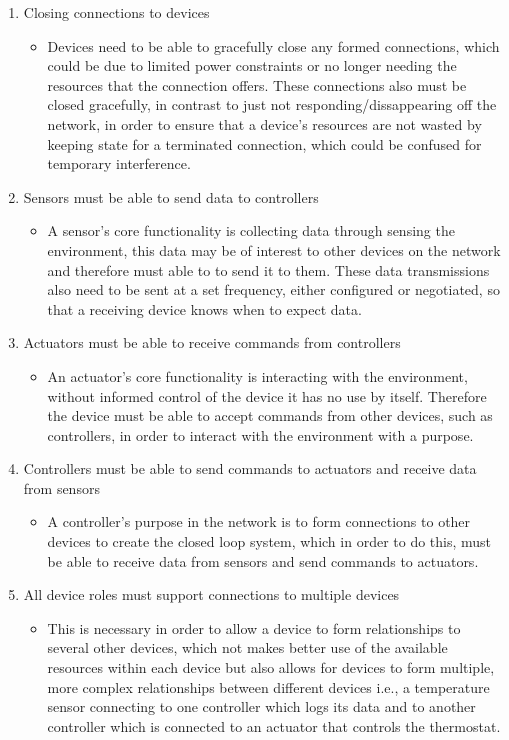 \begin{enumerate}
\begin{itemize}
	\end{itemize}
	\item Closing connections to devices
	\begin{itemize}
		\item Devices need to be able to gracefully close any formed connections, which could be due to limited power constraints or no longer needing the resources that the connection offers. These connections also must be closed gracefully, in contrast to just not responding/dissappearing off the network, in order to ensure that a device's resources are not wasted by keeping state for a terminated connection, which could be confused for temporary interference.
	\end{itemize}
	\item Sensors must be able to send data to controllers
	\begin{itemize}
		\item A sensor's core functionality is collecting data through sensing the environment, this data may be of interest to other devices on the network and therefore must able to to send it to them. These data transmissions also need to be sent at a set frequency, either configured or negotiated, so that a receiving device knows when to expect data.
	\end{itemize}
	\item Actuators must be able to receive commands from controllers
	\begin{itemize}
		\item An actuator's core functionality is interacting with the environment, without informed control of the device it has no use by itself. Therefore the device must be able to accept commands from other devices, such as controllers, in order to interact with the environment with a purpose.
	\end{itemize}
	\item Controllers must be able to send commands to actuators and receive data from sensors
	\begin{itemize}
		\item A controller's purpose in the network is to form connections to other devices to create the closed loop system, which in order to do this, must be able to receive data from sensors and send commands to actuators. 
	\end{itemize}
	\item All device roles must support connections to multiple devices 
	\begin{itemize}
		\item This is necessary in order to allow a device to form relationships to several other devices, which not makes better use of the available resources within each device but also allows for devices to form multiple, more complex relationships between different devices i.e., a temperature sensor connecting to one controller which logs its data and to another controller which is connected to an actuator that controls the thermostat.

\end{itemize}
\end{enumerate}
